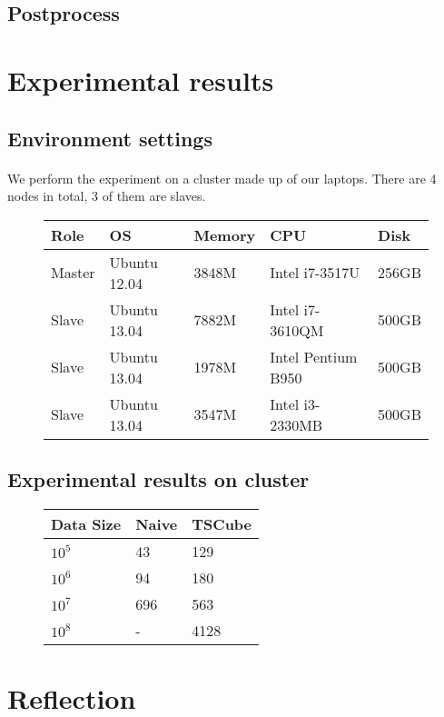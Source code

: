 \documentclass{article}
\begin{document}
\subsection{Postprocess}

\section{Experimental results}

\subsection{Environment settings}

\paragraph{}
We perform the experiment on a cluster made up of our laptops. There are 4 nodes in total, 3 of them are slaves.

\begin{figure}[H]
\begin{tabular}{l l l l l}
Role & OS & Memory & CPU & Disk \\
\hline
Master & Ubuntu 12.04 & 3848M & Intel i7-3517U & 256GB \\
Slave & Ubuntu 13.04  & 7882M & Intel i7-3610QM & 500GB \\
Slave & Ubuntu 13.04 & 1978M & Intel Pentium B950 & 500GB \\
Slave & Ubuntu 13.04 & 3547M & Intel i3-2330MB & 500GB
\end{tabular}
\end{figure}

\subsection{Experimental results on cluster}

\begin{figure}[H]
\begin{tabular}{l l l}
Data Size & Naive & TSCube \\
\hline
$10^{5}$ & 43 & 129 \\
$10^{6}$ & 94 & 180 \\
$10^{7}$ & 696 & 563 \\
$10^{8}$ & - & 4128 \\
\end{tabular}
\end{figure}

\section{Reflection}
\end{document}
